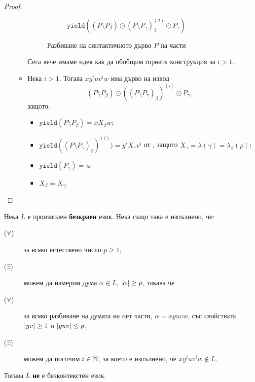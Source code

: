 \begin{proof}
\begin{enumerate}[1)]
\begin{itemize}
\begin{figure}[htp]
\begin{subfigure}[t]{0.5\textwidth}
          \caption{$\texttt{yield}((P\setminus P_\beta) \odot (P\setminus P_\gamma)^{(2)}_\beta\odot P_\gamma)$}
        \end{subfigure}
        \caption{Разбиване на синтактичното дърво $P$ на части}
      \end{figure}
      
      Сега вече имаме идея как да обобщим горната конструкция за $i > 1$.
    \item
      Нека $i > 1$. Тогава $xy^iuv^iw$ има дърво на извод
      \[(P \setminus P_\beta) \odot ( (P \setminus P_\gamma)_\beta)^{(i)} \odot P_\gamma,\]
      защото:
      \begin{itemize}
      \item
        $\texttt{yield}(P\setminus P_\beta) = x X_\beta w$;
      \item
        $\texttt{yield}((P \setminus P_\gamma)_\beta)^{(i)}) = y^i X_\gamma v^i$ от ,
        защото $X_\gamma = \lambda(\gamma) = \lambda_\beta(\rho)$;
      \item
        $\texttt{yield}(P_\gamma) = u$;
      \item
        $X_\beta = X_\gamma$.
      \end{itemize}
    \end{itemize}

  \end{enumerate}
\end{proof}

\begin{cor}
  \label{cor:pumping-context-free}
  Нека $L$ е произволен {\bf безкраен} език. Нека също така е изпълнено, че:
  \begin{description}
  \item[($\forall$)]
    за {\em всяко} естествено число $p \geq 1$,
  \item[($\exists$)]
    можем да намерим дума $\alpha \in L$, $\vert{\alpha}\vert\geq p$, такава че
  \item[($\forall$)]
    за {\em всяко} разбиване на думата на пет части, $\alpha = xyuvw$, със свойствата $\vert{yv}\vert \geq 1$ и $\vert{yuv}\vert \leq p$,
  \item[($\exists$)]
    можем да посочим $i \in \mathbb{N}$, за което е изпълнено, че $xy^iuv^iw \not\in L$.
  \end{description}  
  Тогава $L$ {\bf не} е безконтекстен език.
\end{cor}

